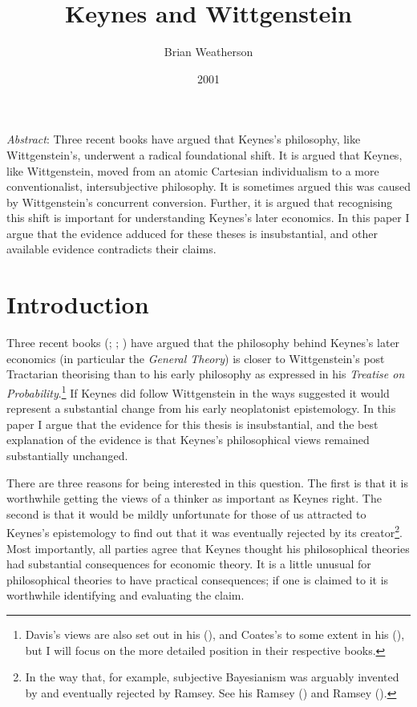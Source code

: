 \documentclass[
  11pt,
  letterpaper,
  DIV=11,
  numbers=noendperiod,
  twoside]{scrartcl}
\title{Keynes and Wittgenstein}
\author{Brian Weatherson}
\date{2001}
\renewenvironment{abstract}
 {\vspace{-1.25cm}
 \quotation\small\noindent\emph{Abstract}:}
 {\endquotation}
\renewenvironment{abstract}
 {\quotation\small\noindent\emph{Abstract}:}
 {\endquotation\vspace{-0.02cm}}
\begin{document}
\maketitle
\begin{abstract}
Three recent books have argued that Keynes's philosophy, like
Wittgenstein's, underwent a radical foundational shift. It is argued
that Keynes, like Wittgenstein, moved from an atomic Cartesian
individualism to a more conventionalist, intersubjective philosophy. It
is sometimes argued this was caused by Wittgenstein's concurrent
conversion. Further, it is argued that recognising this shift is
important for understanding Keynes's later economics. In this paper I
argue that the evidence adduced for these theses is insubstantial, and
other available evidence contradicts their claims.
\end{abstract}


\section{Introduction}\label{introduction}

Three recent books (;
;
) have argued that the philosophy
behind Keynes's later economics (in particular the \emph{General
Theory}) is closer to Wittgenstein's post Tractarian theorising than to
his early philosophy as expressed in his \emph{Treatise on
Probability}.\footnote{Davis's views are also set out in his
  (), and Coates's to some extent in his
  (), but I will focus on the more
  detailed position in their respective books.} If Keynes did follow
Wittgenstein in the ways suggested it would represent a substantial
change from his early neoplatonist epistemology. In this paper I argue
that the evidence for this thesis is insubstantial, and the best
explanation of the evidence is that Keynes's philosophical views
remained substantially unchanged.

There are three reasons for being interested in this question. The first
is that it is worthwhile getting the views of a thinker as important as
Keynes right. The second is that it would be mildly unfortunate for
those of us attracted to Keynes's epistemology to find out that it was
eventually rejected by its creator\footnote{In the way that, for
  example, subjective Bayesianism was arguably invented by and
  eventually rejected by Ramsey. See his Ramsey
  () and Ramsey
  ().}. Most importantly, all
parties agree that Keynes thought his philosophical theories had
substantial consequences for economic theory. It is a little unusual for
philosophical theories to have practical consequences; if one is claimed
to it is worthwhile identifying and evaluating the claim.
\end{document}
